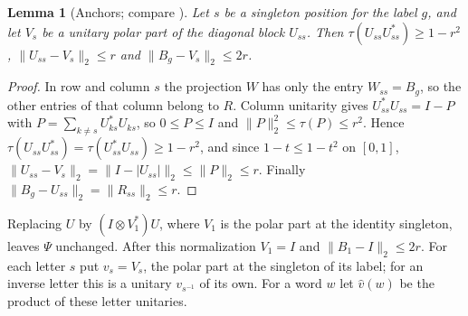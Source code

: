 \documentclass[11pt]{article}
\newtheorem{lemma}[theorem]{Lemma}
\begin{document}
\begin{lemma}[Anchors; compare {\cite[Appendix~I.1]{MghirbiDouglasV1}}]\label{lem:anchor}
Let $s$ be a singleton position for the label $g$, and let $V_s$ be a unitary polar part of the diagonal block $U_{ss}$.  Then $\tau(U_{ss}U_{ss}^*)\ge1-r^2$, $\|U_{ss}-V_s\|_2\le r$ and $\|B_g-V_s\|_2\le2r$.
\end{lemma}
\begin{proof}
In row and column $s$ the projection $W$ has only the entry $W_{ss}=B_g$, so the other entries of that column belong to $R$.  Column unitarity gives $U_{ss}^*U_{ss}=I-P$ with $P=\sum_{k\ne s}U_{ks}^*U_{ks}$, so $0\le P\le I$ and $\|P\|_2^2\le\tau(P)\le r^2$.  Hence $\tau(U_{ss}U_{ss}^*)=\tau(U_{ss}^*U_{ss})\ge1-r^2$, and since $1-t\le1-t^2$ on $[0,1]$, $\|U_{ss}-V_s\|_2=\|I-|U_{ss}|\|_2\le\|P\|_2\le r$.  Finally $\|B_g-U_{ss}\|_2=\|R_{ss}\|_2\le r$.
\end{proof}

Replacing $U$ by $(I\otimes V_1^*)U$, where $V_1$ is the polar part at the identity singleton, leaves $\Psi$ unchanged.  After this normalization $V_1=I$ and $\|B_1-I\|_2\le2r$.  For each letter $s$ put $v_s=V_{s}$, the polar part at the singleton of its label; for an inverse letter this is a unitary $v_{s^{-1}}$ of its own.  For a word $w$ let $\hat v(w)$ be the product of these letter unitaries.
\end{document}
